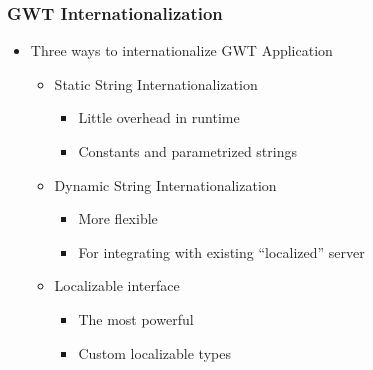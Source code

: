 \documentclass[10pt,table, xcolor=pdflatex]{beamer}
\begin{document}
\begin{frame}\frametitle{GWT Internationalization}
	\begin{itemize}
		\item Three ways to internationalize GWT Application
          \begin{itemize}
        	\item Static String Internationalization\\
              \begin{itemize}
            	\item Little overhead in runtime
                \item Constants and parametrized strings
              \end{itemize}
            \item Dynamic String Internationalization\\
              \begin{itemize}
            	\item More flexible
                \item For integrating with existing ``localized'' server
              \end{itemize}
            \item Localizable interface\\
              \begin{itemize}
            	\item The most powerful
                \item Custom localizable types
              \end{itemize}
          \end{itemize}
	\end{itemize}
\end{frame}
\end{document}
